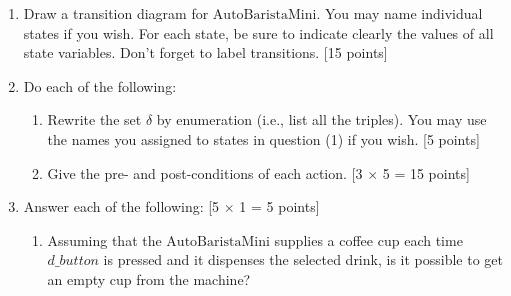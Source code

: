 \documentclass[12pt,fleqn]{article}
\begin{document}
\begin{enumerate}
\item Draw a transition diagram for $\mathrm{AutoBaristaMini}$. You may name individual states if you wish. For each state, be sure to indicate clearly the values of all state variables. Don't forget to label transitions. [15 points]

%
%
%
%
%
%
%



\clearpage

\item Do each of the following:
\begin{enumerate}
\item Rewrite the set $\delta$ by enumeration (i.e., list all the triples). You may use the names you assigned to states in question (1) if you wish.  [5 points]

\vspace*{1in} %



\item Give the pre- and post-conditions of each action. [3 $\times$ 5 = 15 points]
\end{enumerate}




\clearpage

\item Answer each of the following: [5 $\times$ 1 = 5 points]
\begin{enumerate}
\item Assuming that the $\mathrm{AutoBaristaMini}$ supplies a coffee cup each time $d\_button$ is pressed and it dispenses the selected drink, is it possible to get an empty cup from the machine?


\end{enumerate}
\end{enumerate}
\end{document}
